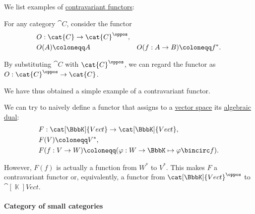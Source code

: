 \begin{example}\label{ex:def:contravariant_functor}
  We list examples of \hyperref[def:contravariant_functor]{contravariant functors}:
  \begin{thmenum}
     For any category \( \cat{C} \), consider the functor
    \begin{equation*}
      \begin{aligned}
        &O: \cat{C} \to \cat{C}^\oppos, \\
        &O(A) \coloneqq A
        &O(f: A \to B) \coloneqq f^*. \\
      \end{aligned}
    \end{equation*}

    By substituting \( \cat{C} \) with \( \cat{C}^\oppos \), we can regard the functor as \( O: \cat{C}^\oppos \to \cat{C} \).

    We have thus obtained a simple example of a contravariant functor.

     We can try to naively define a functor that assigns to a \hyperref[def:vector_space]{vector space} its \hyperref[def:dual_vector_space]{algebraic dual}:
    \begin{equation*}
      \begin{aligned}
        &F: \cat[\BbbK]{Vect} \to \cat[\BbbK]{Vect}, \\
        &F(V) \coloneqq V^*, \\
        &F(f: V \to W) \coloneqq (\varphi: W \to \BbbK \mapsto \varphi \bincirc f).
      \end{aligned}
    \end{equation*}

    However, \( F(f) \) is actually a function from \( W^* \) to \( V^* \). This makes \( F \) a contravariant functor or, equivalently, a functor from \( \cat[\BbbK]{Vect}^\oppos \) to \( \cat[\BbbK]{Vect} \).
  \end{thmenum}
\end{example}

\paragraph{Category of small categories}

